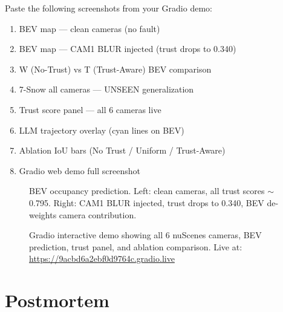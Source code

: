 \documentclass[10pt,twocolumn]{article}
\begin{document}
\begin{tcolorbox}[colback=yellow!10,colframe=myorange,title=
  {\faCamera\; Insert Actual Output Screenshots Here}]
\small
Paste the following screenshots from your Gradio demo:
\begin{enumerate}[leftmargin=*,topsep=2pt,itemsep=1pt]
  \item BEV map --- clean cameras (no fault)
  \item BEV map --- CAM1 BLUR injected (trust drops to 0.340)
  \item W (No-Trust) vs T (Trust-Aware) BEV comparison
  \item 7-Snow all cameras --- UNSEEN generalization
  \item Trust score panel --- all 6 cameras live
  \item LLM trajectory overlay (cyan lines on BEV)
  \item Ablation IoU bars (No Trust / Uniform / Trust-Aware)
  \item Gradio web demo full screenshot
\end{enumerate}
\normalsize
\end{tcolorbox}

\begin{figure}[h]
\centering
{}
\caption{BEV occupancy prediction. Left: clean cameras, all trust
scores $\sim$0.795. Right: CAM1 BLUR injected, trust drops to 0.340,
BEV de-weights camera contribution.}
\label{fig:bev_result}
\end{figure}

\begin{figure}[h]
\centering
{}
\caption{Gradio interactive demo showing all 6 nuScenes cameras,
BEV prediction, trust panel, and ablation comparison.
Live at: \url{https://9acbd6a2ebf0d9764c.gradio.live}}
\label{fig:gradio}
\end{figure}

\section{Postmortem}
\label{sec:postmortem}
\end{document}
